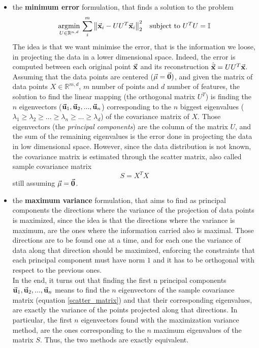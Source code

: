 \documentclass[letterpaper]{article}
\begin{document}
	\begin{itemize}
		\item the \textbf{minimum error} formulation, that finds a solution to the problem
		\begin{equation}
\underset{U\in \mathbb{R}^{n,d}}{\mathrm{argmin}}\, \sum_{i}^{m}\norm{\va{x}_i - UU^T\va{x}_i}^2_2 \quad \mathrm{subject\ to\ } U^TU=\mathbb{I}
		\end{equation}
	The idea is that we want minimise the error, that is the information we loose, in projecting the data in a lower dimensional space. Indeed, the error is computed between each original point $\va{x}$ and its reconstruction $\hat{\va{x}}=UU^T\va{x}$. \\
	Assuming that the data points are centered ($\va{\mu}=\va{0})$, and given the matrix of data points $X \in \mathbb{R}^{m,d}$, $m$ number of points and $d$ number of features, the solution to find the linear mapping (the orthogonal matrix $U^T$) is finding the $n$ eigenvectors ($\va{u}_1,\va{u}_2,...,\va{u}_n$) corresponding to the $n$ biggest eigenvalues ($\lambda_1\ge \lambda_2\ge ... \ge \lambda_n \ge ... \ge \lambda_d$) of the covariance matrix of $X$. Those eigenvectors (the \emph{principal components}) are the column of the matrix $U$, and the sum of the remaining eigenvalues is the error done in projecting the data in low dimensional space. However, since the data distribution is not known, the covariance matrix is estimated through the scatter matrix, also called sample covariance matrix
	\begin{equation} \label{scatter_matrix}
		S = X^TX
	\end{equation}
	still assuming $\va{\mu}=\va{0}$.
	\item the \textbf{maximum variance} formulation, that aims to find as principal components the directions where the variance of the projection of data points is maximized, since the idea is that the directions where the variance is maximum, are the ones where the information carried also is maximal. Those directions are to be found one at a time, and for each one the variance of data along that direction should be maximized,  enforcing the constraints that each principal component must have norm $1$ and it has to be orthogonal with respect to the previous ones. \\
	In the end, it turns out that finding the first n principal components $\va{u}_1,\va{u}_2,...,\va{u}_n$ means to find the $n$ eigenvectors of the sample covariance matrix (equation \ref{scatter_matrix}) and that their corresponding eigenvalues, are exactly the variance of the points projected along that directions. In particular, the first $n$ eigenvectors found with the maximization variance method, are the ones corresponding to the $n$ maximum eigenvalues of the matrix $S$. Thus, the two methods are exactly equivalent.
	\end{itemize}
\end{document}
